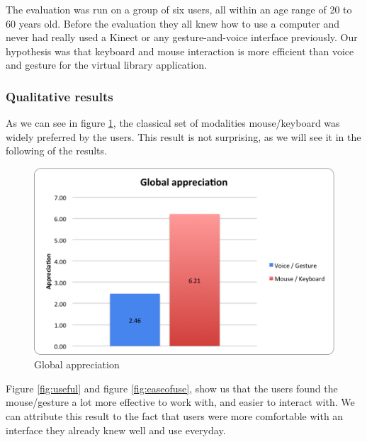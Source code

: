 \documentclass[a4paper, 10pt]{article}
\begin{document}
	\par{The evaluation was run on a group of six users, all within an age range of 20 to 60 years old. Before the evaluation they all knew how to use a computer and never had really used a Kinect or any gesture-and-voice interface previously. Our hypothesis was that keyboard and mouse interaction is more efficient than voice and gesture for the virtual library application.}
	
	\subsubsection{Qualitative results}
	
	\par{As we can see in figure \ref{fig:appreciation}, the classical set of modalities mouse/keyboard was widely preferred by the users. This result is not surprising, as we will see it in the following of the results.}
	
	\begin{figure}[h]
		\centering
			\includegraphics[scale=0.7]{graphs/globa_appreciation.png}
		\caption{Global appreciation}
		\label{fig:appreciation}
	\end{figure}
	
	\par{Figure \ref{fig:useful} and figure \ref{fig:easeofuse}, show us that the users found the mouse/gesture a lot more effective to work with, and easier to interact with. We can attribute this result to the fact that users were more comfortable with an interface they already knew well and use everyday.}
	
\end{document}
